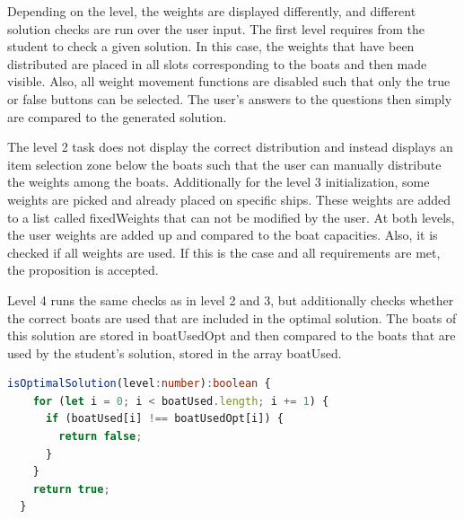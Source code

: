 Depending on the level, the weights are displayed differently, and different solution checks are run over the user input. The first level requires from the student to check a given solution. In this case, the weights that have been distributed are placed in all slots corresponding to the boats and then made visible. Also, all weight movement functions are disabled such that only the true or false buttons can be selected. The user's answers to the questions then simply are compared to the generated solution. 

The level 2 task does not display the correct distribution and instead displays an item selection zone below the boats such that the user can manually distribute the weights among the boats. Additionally for the level 3 initialization, some weights are picked and already placed on specific ships. These weights are added to a list called fixedWeights that can not be modified by the user. At both levels, the user weights are added up and compared to the boat capacities. Also, it is checked if all weights are used. If this is the case and all requirements are met, the proposition is accepted.

Level 4 runs the same checks as in level 2 and 3, but additionally checks whether the correct boats are used that are included in the optimal solution. The boats of this solution are stored in boatUsedOpt and then compared to the boats that are used by the student's solution, stored in the array boatUsed.

\begin{lstlisting}[language=TypeScript,caption={},label={lst:isOptimalSolution}]
isOptimalSolution(level:number):boolean {
    for (let i = 0; i < boatUsed.length; i += 1) {
      if (boatUsed[i] !== boatUsedOpt[i]) {
        return false;
      }
    }
    return true;
  }
\end{lstlisting}
